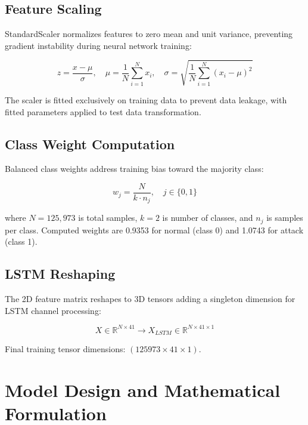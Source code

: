 \documentclass[12pt,a4paper]{report}
\begin{document}
\subsection{Feature Scaling}

StandardScaler normalizes features to zero mean and unit variance, preventing gradient instability during neural network training:

\begin{equation}
    z = \frac{x - \mu}{\sigma}, \quad \mu = \frac{1}{N}\sum_{i=1}^{N} x_i, \quad \sigma = \sqrt{\frac{1}{N}\sum_{i=1}^{N}(x_i - \mu)^2}
\end{equation}

The scaler is fitted exclusively on training data to prevent data leakage, with fitted parameters applied to test data transformation.

\subsection{Class Weight Computation}

Balanced class weights address training bias toward the majority class:

\begin{equation}
    w_j = \frac{N}{k \cdot n_j}, \quad j \in \{0, 1\}
\end{equation}

where $N = 125,973$ is total samples, $k = 2$ is number of classes, and $n_j$ is samples per class. Computed weights are 0.9353 for normal (class 0) and 1.0743 for attack (class 1).

\subsection{LSTM Reshaping}

The 2D feature matrix reshapes to 3D tensors adding a singleton dimension for LSTM channel processing:

\begin{equation}
    X \in \mathbb{R}^{N \times 41} \rightarrow X_{LSTM} \in \mathbb{R}^{N \times 41 \times 1}
\end{equation}

Final training tensor dimensions: $(125973 \times 41 \times 1)$.

\section{Model Design and Mathematical Formulation}
\end{document}
